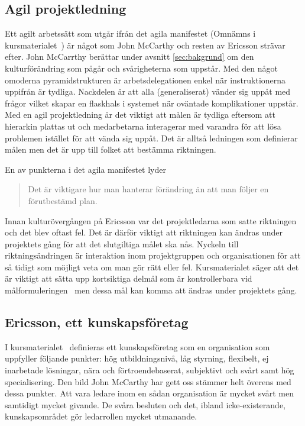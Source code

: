 \subsection{Agil projektledning}
Ett agilt arbetssätt som utgår ifrån det agila manifestet (Omnämns i kursmaterialet~\citep{projekt}) är något som John McCarthy och resten av Ericsson strävar efter. John McCarrthy berättar under avsnitt \ref{sec:bakgrund} om den kulturförändring som pågår och svårigheterna som uppstår. Med den något omoderna pyramidstrukturen är arbetsdelegationen enkel när instruktionerna uppifrån är tydliga. Nackdelen är att alla (generaliserat) vänder sig uppåt med frågor vilket skapar en flaskhals i systemet när oväntade komplikationer uppstår. Med en agil projektledning är det viktigt att målen är tydliga eftersom att hierarkin plattas ut och medarbetarna interagerar med varandra för att lösa problemen istället för att vända sig uppåt. Det är alltså ledningen som definierar målen men det är upp till folket att bestämma riktningen.

En av punkterna i det agila manifestet lyder
\begin{quote}
Det är viktigare hur man hanterar förändring än att man följer en förutbestämd plan.
\end{quote}
Innan kulturövergången på Ericsson var det projektledarna som satte riktningen och det blev oftast fel. Det är därför viktigt att riktningen kan ändras under projektets gång för att det slutgiltiga målet ska nås. Nyckeln till riktningsändringen är interaktion inom projektgruppen och organisationen för att så tidigt som möjligt veta om man gör rätt eller fel. Kursmaterialet säger att det är viktigt att sätta upp kortsiktiga delmål som är kontrollerbara vid målformuleringen~\citep{projekt} men dessa mål kan komma att ändras under projektets gång.

\subsection{Ericsson, ett kunskapsföretag}
I kursmaterialet~\citep{teknik} definieras ett kunskapsföretag som en organisation som uppfyller följande punkter: hög utbildningsnivå, låg styrning, flexibelt, ej inarbetade lösningar, nära och förtroendebaserat, subjektivt och svårt samt hög specialisering. Den bild John McCarthy har gett oss stämmer helt överens med dessa punkter. Att vara ledare inom en sådan organisation är mycket svårt men samtidigt mycket givande. De svåra besluten och det, ibland icke-existerande, kunskapsområdet gör ledarrollen mycket utmanande.
